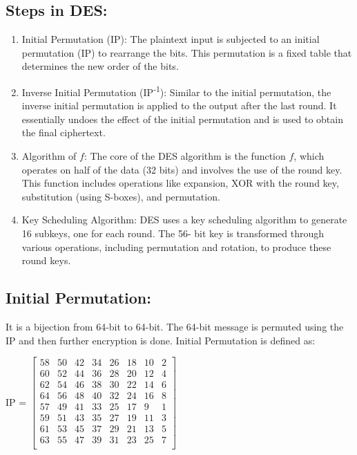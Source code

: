 \documentclass[11pt]{article}
\begin{document}
\subsection*{Steps in DES:}

\begin{enumerate}[label=\arabic*.]
    \item Initial Permutation (IP):
    The plaintext input is subjected to an initial permutation (IP) to rearrange the bits. This
    permutation is a fixed table that determines the new order of the bits.
    
    \item Inverse Initial Permutation (IP\textsuperscript{-1}):
    Similar to the initial permutation, the inverse initial permutation is applied to the output
    after the last round. It essentially undoes the effect of the initial permutation and is used to
    obtain the final ciphertext.
    
    \item Algorithm of \(f\):
    The core of the DES algorithm is the function \(f\), which operates on half of the data (32 bits)
    and involves the use of the round key. This function includes operations like expansion, XOR
    with the round key, substitution (using S-boxes), and permutation.
    
    \item Key Scheduling Algorithm:
    DES uses a key scheduling algorithm to generate 16 subkeys, one for each round. The 56-
    bit key is transformed through various operations, including permutation and rotation, to
    produce these round keys.
\end{enumerate}

\subsection*{Initial Permutation:}

It is a bijection from 64-bit to 64-bit. The 64-bit message is permuted using the IP and then further encryption is done. Initial Permutation is defined as:
\begin{center}
IP =  
    $\begin{bmatrix}
    58 & 50 & 42 & 34 & 26 & 18 & 10 & 2\\
    60 & 52 & 44 & 36 & 28 & 20 & 12 & 4\\
    62 & 54 & 46 & 38 & 30 & 22 & 14 & 6\\
    64 & 56 & 48 & 40 & 32 & 24 & 16 & 8\\
    57 & 49 & 41 & 33 & 25 & 17 & 9 & 1\\
    59 & 51 & 43 & 35 & 27 & 19 & 11 & 3\\
    61 & 53 & 45 & 37 & 29 & 21 & 13 & 5\\
    63 & 55 & 47 & 39 & 31 & 23 & 25 & 7\\
    \end{bmatrix}$
\end{center}
\end{document}
